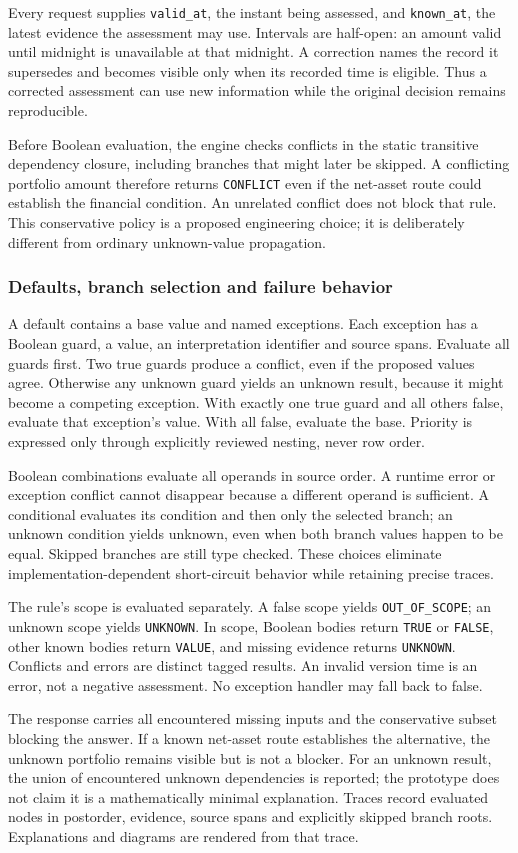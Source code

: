 Every request supplies \texttt{valid\_at}, the instant being assessed, and
\texttt{known\_at}, the latest evidence the assessment may use. Intervals are
half-open: an amount valid until midnight is unavailable at that midnight.
A correction names the record it supersedes and becomes visible only when its
recorded time is eligible. Thus a corrected assessment can use new information
while the original decision remains reproducible.

Before Boolean evaluation, the engine checks conflicts in the static transitive
dependency closure, including branches that might later be skipped. A conflicting
portfolio amount therefore returns \texttt{CONFLICT} even if the net-asset route
could establish the financial condition. An unrelated conflict does not block
that rule. This conservative policy is a proposed engineering choice; it is
deliberately different from ordinary unknown-value propagation.

\subsubsection{Defaults, branch selection and failure behavior}

A default contains a base value and named exceptions. Each exception has a
Boolean guard, a value, an interpretation identifier and source spans. Evaluate
all guards first. Two true guards produce a conflict, even if the proposed values
agree. Otherwise any unknown guard yields an unknown result, because it might
become a competing exception. With exactly one true guard and all others false,
evaluate that exception's value. With all false, evaluate the base. Priority is
expressed only through explicitly reviewed nesting, never row order.

Boolean combinations evaluate all operands in source order. A runtime error or
exception conflict cannot disappear because a different operand is sufficient.
A conditional evaluates its condition and then only the selected branch; an
unknown condition yields unknown, even when both branch values happen to be
equal. Skipped branches are still type checked. These choices eliminate
implementation-dependent short-circuit behavior while retaining precise traces.

The rule's scope is evaluated separately. A false scope yields
\texttt{OUT\_OF\_SCOPE}; an unknown scope yields \texttt{UNKNOWN}. In scope,
Boolean bodies return \texttt{TRUE} or \texttt{FALSE}, other known bodies return
\texttt{VALUE}, and missing evidence returns \texttt{UNKNOWN}. Conflicts and
errors are distinct tagged results. An invalid version time is an error, not a
negative assessment. No exception handler may fall back to false.

The response carries all encountered missing inputs and the conservative subset
blocking the answer. If a known net-asset route establishes the alternative,
the unknown portfolio remains visible but is not a blocker. For an unknown
result, the union of encountered unknown dependencies is reported; the prototype
does not claim it is a mathematically minimal explanation. Traces record evaluated
nodes in postorder, evidence, source spans and explicitly skipped branch roots.
Explanations and diagrams are rendered from that trace.
